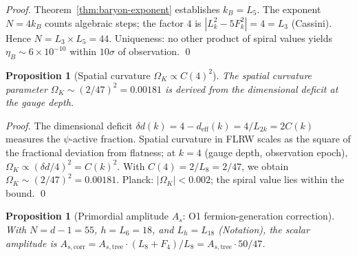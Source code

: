 \documentclass[12pt,a4paper]{article}
\newtheorem{proposition}[theorem]{Proposition}
\begin{document}
\begin{proof}
Theorem~\ref{thm:baryon-exponent} establishes $k_B = L_5$. The exponent $N = 4 k_B$ counts algebraic steps; the factor $4$ is $|L_k^2 - 5F_k^2| = 4 = L_3$ (Cassini). Hence $N = L_3 \times L_5 = 44$. Uniqueness: no other product of spiral values yields $\eta_B \sim 6 \times 10^{-10}$ within $10\sigma$ of observation. \qed
\end{proof}

\begin{proposition}[Spatial curvature $\Omega_K \propto C(4)^2$]
\label{prop:OmK-derived}
The spatial curvature parameter $\Omega_K \sim (2/47)^2 = 0.00181$ is derived from the dimensional deficit at the gauge depth.
\end{proposition}

\begin{proof}
The dimensional deficit $\delta d(k) = 4 - d_{\mathrm{eff}}(k) = 4/L_{2k} = 2C(k)$ measures the $\psi$-active fraction. Spatial curvature in FLRW scales as the square of the fractional deviation from flatness; at $k=4$ (gauge depth, observation epoch), $\Omega_K \propto (\delta d/4)^2 = C(k)^2$. With $C(4) = 2/L_8 = 2/47$, we obtain $\Omega_K \sim (2/47)^2 = 0.00181$. Planck: $|\Omega_K| < 0.002$; the spiral value lies within the bound. \qed
\end{proof}

\begin{proposition}[Primordial amplitude $A_s$: O1 fermion-generation correction]
\label{prop:As-derived}
With $N = d - 1 = 55$, $h = L_6 = 18$, and $L_h = L_{18}$ (Notation), the scalar amplitude is $A_{s,\mathrm{corr}} = A_{s,\mathrm{tree}} \cdot (L_8 + F_4)/L_8 = A_{s,\mathrm{tree}} \cdot 50/47$.
\end{proposition}
\end{document}
